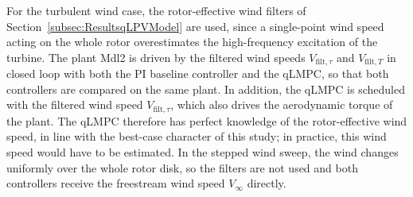 For the turbulent wind case, the rotor-effective wind filters of Section~\ref{subsec:ResultsqLPVModel} are used, since a single-point wind speed acting on the whole rotor overestimates the high-frequency excitation of the turbine. The plant Mdl2 is driven by the filtered wind speeds $V_{\text{filt},\tau}$ and $V_{\text{filt},T}$ in closed loop with both the PI baseline controller and the qLMPC, so that both controllers are compared on the same plant. In addition, the qLMPC is scheduled with the filtered wind speed $V_{\text{filt},\tau}$, which also drives the aerodynamic torque of the plant. The qLMPC therefore has perfect knowledge of the rotor-effective wind speed, in line with the best-case character of this study; in practice, this wind speed would have to be estimated. In the stepped wind sweep, the wind changes uniformly over the whole rotor disk, so the filters are not used and both controllers receive the freestream wind speed $V_\infty$ directly.
